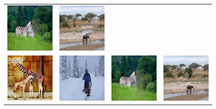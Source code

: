 \begin{figure}[H]
\begin{tabular}{cccc}
\includegraphics[width=.24\textwidth]{figures/random/000000270244_pm.jpg}&
\includegraphics[width=.24\textwidth]{figures/random/000000286994_pm.jpg} \\
\includegraphics[width=.24\textwidth]{figures/random/000000153299_sig.jpg}&
\includegraphics[width=.24\textwidth]{figures/random/000000266409_sig.jpg}&
\includegraphics[width=.24\textwidth]{figures/random/000000270244_sig.jpg}&
\includegraphics[width=.24\textwidth]{figures/random/000000286994_sig.jpg} \\

\end{tabular}
\end{figure}
